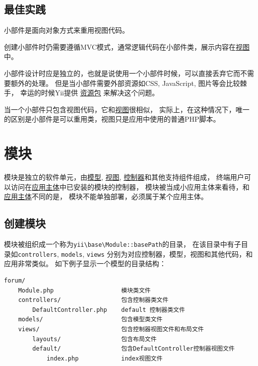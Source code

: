\subsection{最佳实践 \label{structure-widgets.md::best-practices}}
小部件是面向对象方式来重用视图代码。

创建小部件时仍需要遵循MVC模式，通常逻辑代码在小部件类，展示内容在\hyperref[structure-views.md]{视图}中。

小部件设计时应是独立的，也就是说使用一个小部件时候，可以直接丢弃它而不需要额外的处理。
但是当小部件需要外部资源如CSS, JavaScript, 图片等会比较棘手，
幸运的时候Yii提供 \hyperref[structure-asset-bundles.md]{资源包} 来解决这个问题。

当一个小部件只包含视图代码，它和\hyperref[structure-views.md]{视图}很相似，
实际上，在这种情况下，唯一的区别是小部件是可以重用类，视图只是应用中使用的普通PHP脚本。



\label{structure-modules.md}\section{模块}
模块是独立的软件单元，由\hyperref[structure-models.md]{模型}, \hyperref[structure-views.md]{视图},
\hyperref[structure-controllers.md]{控制器}和其他支持组件组成，
终端用户可以访问在\hyperref[structure-applications.md]{应用主体}中已安装的模块的控制器，
模块被当成小应用主体来看待，和\hyperref[structure-applications.md]{应用主体}不同的是，
模块不能单独部署，必须属于某个应用主体。

\subsection{创建模块 \label{structure-modules.md::creating-modules}}
模块被组织成一个称为\texttt{yii{\allowbreak{}\textbackslash}base{\allowbreak{}\textbackslash}Module\allowbreak{}::\allowbreak{}basePath}的目录，
在该目录中有子目录如\lstinline|controllers|, \lstinline|models|, \lstinline|views| 分别为对应控制器，模型，视图和其他代码，和应用非常类似。
如下例子显示一个模型的目录结构：

\begin{lstlisting}
forum/
    Module.php                   模块类文件
    controllers/                 包含控制器类文件
        DefaultController.php    default 控制器类文件
    models/                      包含模型类文件
    views/                       包含控制器视图文件和布局文件
        layouts/                 包含布局文件
        default/                 包含DefaultController控制器视图文件
            index.php            index视图文件
\end{lstlisting}
